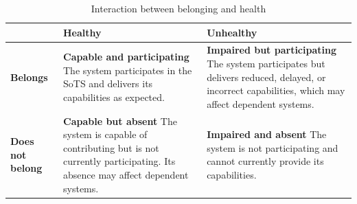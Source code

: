 \begin{table}[htp]
\centering
\caption{Interaction between belonging and health}
\label{tab:belonging-health}
\small
\begin{tabular}{p{2cm}|p{6cm}|p{6cm}}
 & \textbf{Healthy} & \textbf{Unhealthy} \\
\hline
\textbf{Belongs}
& \textbf{Capable and participating} 
\newline The system participates in the SoTS and delivers its capabilities as expected.
& \textbf{Impaired but participating} 
\newline The system participates but delivers reduced, delayed, or incorrect capabilities, which may affect dependent systems.\\

\textbf{Does not belong}
& \textbf{Capable but absent} 
\newline The system is capable of contributing but is not currently participating. Its absence may affect dependent systems.
& \textbf{Impaired and absent} 
\newline The system is not participating and cannot currently provide its capabilities. \\
\end{tabular}
\end{table}